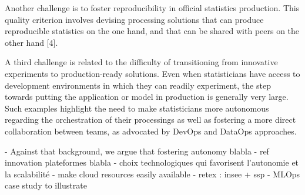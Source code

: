 Another challenge is to foster reproducibility in official statistics production. This quality criterion involves devising processing solutions that can produce reproducible statistics on the one hand, and that can be shared with peers on the other hand [4].

A third challenge is related to the difficulty of transitioning from innovative experiments to production-ready solutions. Even when statisticians have access to development environments in which they can readily experiment, the step towards putting the application or model in production is generally very large. Such examples highlight the need to make statisticians more autonomous regarding the orchestration of their processings as well as fostering a more direct collaboration between teams, as advocated by DevOps and DataOps approaches.
 
- Against that background, we argue that fostering autonomy blabla
- ref innovation plateformes blabla
- choix technologiques qui favorisent l'autonomie et la scalabilité
- make cloud resources easily available
- retex : insee + ssp
- MLOps case study to illustrate

